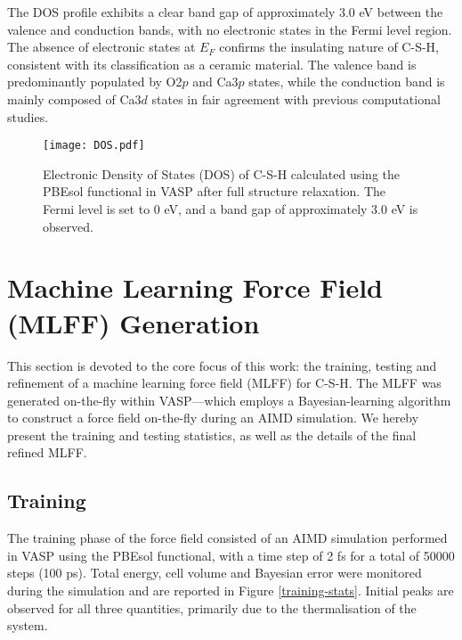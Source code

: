 The DOS profile exhibits a clear band gap of approximately 3.0 eV between the valence and conduction bands, with no electronic states in the Fermi level region. The absence of electronic states at $E_F$ confirms the insulating nature of C-S-H, consistent with its classification as a ceramic material. The valence band is predominantly populated by O2$p$ and Ca3$p$ states, while the conduction band is mainly composed of Ca3$d$ states in fair agreement with previous computational studies\supercite{Dharmawardhana2018}. 
\begin{figure}[H]
    \centering
    \texttt{[image: DOS.pdf]}
    \caption{
        Electronic Density of States (DOS) of C-S-H calculated using the PBEsol functional in VASP after full structure relaxation. The Fermi level is set to 0 eV, and a band gap of approximately 3.0 eV is observed. 
    }
    \label{dos}
\end{figure}

\section{Machine Learning Force Field (MLFF) Generation}
\label{sec:mlff-training}

This section is devoted to the core focus of this work: the training, testing and refinement of a machine learning force field (MLFF) for C-S-H. The MLFF was generated on-the-fly within VASP---which employs a Bayesian-learning algorithm to construct a force field on-the-fly during an AIMD simulation\supercite{zotero-item-773}. We hereby present the training and testing statistics, as well as the details of the final refined MLFF. 
\subsection{Training}
The training phase of the force field consisted of an AIMD simulation performed in VASP using the PBEsol functional, with a time step of 2 fs for a total of 50000 steps (100 ps). Total energy, cell volume and Bayesian error were monitored during the simulation and are reported in Figure \ref{training-stats}. Initial peaks are observed for all three quantities, primarily due to the thermalisation of the system.

